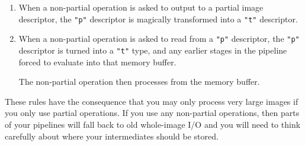 \begin{enumerate}

\item
When a non-partial operation is asked to output to a partial image descriptor,
the \verb+"p"+ descriptor is magically transformed into a \verb+"t"+
descriptor.

\item
When a non-partial operation is asked to read from a \verb+"p"+ descriptor,
the \verb+"p"+ descriptor is turned into a \verb+"t"+ type, and any earlier
stages in the pipeline forced to evaluate into that memory buffer. 

The non-partial operation then processes from the memory buffer.

\end{enumerate}

These rules have the consequence that you may only process very large images
if you only use partial operations. If you use any non-partial operations,
then parts of your pipelines will fall back to old whole-image I/O and you
will need to think carefully about where your intermediates should be stored.


